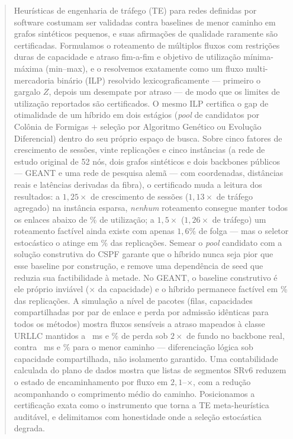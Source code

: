 \documentclass[journal]{IEEEtran}
\begin{document}
\begin{abstract}
Heurísticas de engenharia de tráfego (TE) para redes definidas por software
costumam ser validadas contra baselines de menor caminho em grafos sintéticos
pequenos, e suas afirmações de qualidade raramente são certificadas.
Formulamos o roteamento de múltiplos fluxos com restrições duras de
capacidade e atraso fim-a-fim e objetivo de utilização mínima-máxima
(min--max), e o resolvemos exatamente como um fluxo multi-mercadoria binário
(ILP) resolvido lexicograficamente --- primeiro o gargalo $Z$, depois um
desempate por atraso --- de modo que os limites de utilização reportados são
certificados. O mesmo ILP certifica o gap de otimalidade de um híbrido em
dois estágios (\emph{pool} de candidatos por Colônia de Formigas $+$
seleção por Algoritmo Genético ou Evolução Diferencial) dentro do seu
próprio espaço de busca. Sobre cinco fatores de crescimento de sessões,
vinte replicações e cinco instâncias (a rede de estudo original de 52 nós,
dois grafos sintéticos e dois backbones públicos --- GEANT e uma rede de
pesquisa alemã --- com coordenadas, distâncias reais e latências derivadas
da fibra), o certificado muda a leitura dos resultados: a $1{,}25\times$ de
crescimento de sessões ($1{,}13\times$ de tráfego agregado) na instância
esparsa, \emph{nenhum} roteamento consegue manter todos os enlaces abaixo de
\IlpZmaiaHighPct\% de utilização; a $1{,}5\times$ ($1{,}26\times$ de
tráfego) um roteamento factível ainda existe com apenas $1{,}6\%$ de folga
--- mas o seletor estocástico o atinge em \GaFeasMaiaMax\% das replicações.
Semear o \emph{pool} candidato com a solução construtiva do CSPF garante que
o híbrido nunca seja pior que esse baseline por construção, e remove uma
dependência de seed que reduzia sua factibilidade à metade. No GEANT, o
baseline construtivo é ele próprio inviável (\AntCspfMaxUtil$\times$ da
capacidade) e o híbrido permanece factível em \AntGaFeas\% das replicações.
A simulação a nível de pacotes (filas, capacidades compartilhadas por par de
enlace e perda por admissão idênticas para todos os métodos) mostra fluxos
sensíveis a atraso mapeados à classe URLLC mantidos a \GerDoptTwo~ms e
\GerLossOptTwo\% de perda sob $2\times$ de fundo no backbone real, contra
\GerDdjTwo~ms e \GerLossDjTwo\% para o menor caminho --- diferenciação
lógica sob capacidade compartilhada, não isolamento garantido. Uma
contabilidade calculada do plano de dados mostra que listas de segmentos
SRv6 reduzem o estado de encaminhamento por fluxo em $2{,}1$--\SrvRedMaia$\times$,
com a redução acompanhando o comprimento médio do caminho. Posicionamos a
certificação exata como o instrumento que torna a TE meta-heurística
auditável, e delimitamos com honestidade onde a seleção estocástica degrada.
\end{abstract}
\end{document}
